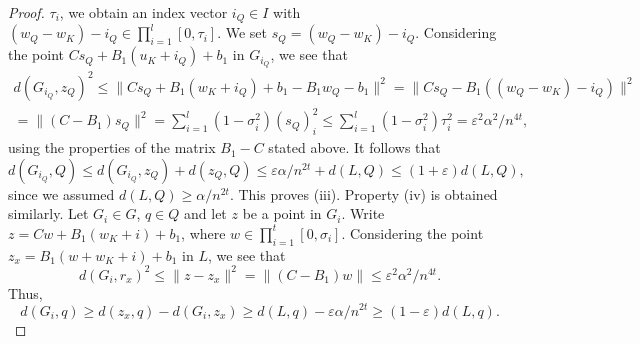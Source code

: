 \documentclass[a4paper,11pt]{paper}
\newcommand{\eps}{\varepsilon}
\begin{document}
\begin{proof}
$\tau_i$,
we obtain an index vector $i_Q \in I$ with
$(w_Q - w_K) - i_Q \in \prod_{i=1}^{l} \left[0,  \tau_i\right]$.
We set $s_Q = (w_Q - w_K) - i_Q$. Considering the point
$Cs_Q + B_1(u_K + i_Q) + b_1$ in  $G_{i_Q}$, we see that
\begin{multline*}
  d(G_{i_Q}, z_Q)^2
    \leq \|Cs_Q + B_1(w_K + i_Q) + b_1 - B_1w_Q - b_1 \|^2
    = \|Cs_Q - B_1((w_Q - w_K) - i_Q) \|^2\\
    = \|(C - B_1)s_Q\|^2
    = \sum_{i=1}^l (1-\sigma_i^2)(s_Q)_i^2
    \leq \sum_{i=1}^l (1-\sigma_i^2)\tau_i^2
    = \eps^2\alpha^2/n^{4t},
\end{multline*}
using the properties of the matrix $B_1 - C$ stated above.
It follows that
\[
  d(G_{i_Q}, Q) \leq
  d(G_{i_Q}, z_Q) + d(z_Q, Q)
    \leq
      \eps\alpha/n^{2t} + d(L, Q)
    \leq (1+\eps)d(L, Q),
\]
since we  assumed $d(L, Q) \geq \alpha/n^{2t}$. This proves
(iii). Property (iv) is obtained similarly.
Let $G_i \in G$, $q \in Q$ and let
$z$ be a point in $G_i$. Write $z = Cw + B_1(w_K + i) + b_1$,
where $w \in \prod_{i=1}^{t} \left[0,  \sigma_i\right]$.
Considering the point $z_x = B_1(w + w_K + i) + b_1$ in $L$,
we see that
\[
  d(G_i, r_x)^2  \leq \|z - z_x\|^2
    = \|(C - B_1)w\|\leq \eps^2\alpha^2/n^{4t}.
\]
Thus,
\[
  d(G_{i}, q) \geq
    d(z_x, q) - d(G_i, z_x)
    \geq
      d(L, q) - \eps\alpha/n^{2t}
    \geq (1 - \eps)d(L, q).
\]
\end{proof}
\end{document}

